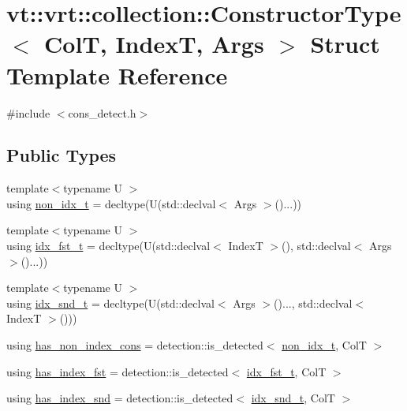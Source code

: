 \hypertarget{structvt_1_1vrt_1_1collection_1_1_constructor_type}{}\section{vt\+:\+:vrt\+:\+:collection\+:\+:Constructor\+Type$<$ ColT, IndexT, Args $>$ Struct Template Reference}
\label{structvt_1_1vrt_1_1collection_1_1_constructor_type}


{\ttfamily \#include $<$cons\+\_\+detect.\+h$>$}

\subsection*{Public Types}
\begin{DoxyCompactItemize}
\item 
{\footnotesize template$<$typename U $>$ }\\using \hyperlink{structvt_1_1vrt_1_1collection_1_1_constructor_type_a25485f9d6d78bd2e7d43f41562411d6a}{non\+\_\+idx\+\_\+t} = decltype(U(std\+::declval$<$ Args $>$()...))
\item 
{\footnotesize template$<$typename U $>$ }\\using \hyperlink{structvt_1_1vrt_1_1collection_1_1_constructor_type_a1c790c5cce774596e5027eb02fe2e1ca}{idx\+\_\+fst\+\_\+t} = decltype(U(std\+::declval$<$ IndexT $>$(), std\+::declval$<$ Args $>$()...))
\item 
{\footnotesize template$<$typename U $>$ }\\using \hyperlink{structvt_1_1vrt_1_1collection_1_1_constructor_type_a816208396419304c8a615ce54fbee9c8}{idx\+\_\+snd\+\_\+t} = decltype(U(std\+::declval$<$ Args $>$()..., std\+::declval$<$ IndexT $>$()))
\item 
using \hyperlink{structvt_1_1vrt_1_1collection_1_1_constructor_type_a576b7cfd2b91a486b3dbc53be1feb3b7}{has\+\_\+non\+\_\+index\+\_\+cons} = detection\+::is\+\_\+detected$<$ \hyperlink{structvt_1_1vrt_1_1collection_1_1_constructor_type_a25485f9d6d78bd2e7d43f41562411d6a}{non\+\_\+idx\+\_\+t}, ColT $>$
\item 
using \hyperlink{structvt_1_1vrt_1_1collection_1_1_constructor_type_a5a20a957219744988e26784279ad5783}{has\+\_\+index\+\_\+fst} = detection\+::is\+\_\+detected$<$ \hyperlink{structvt_1_1vrt_1_1collection_1_1_constructor_type_a1c790c5cce774596e5027eb02fe2e1ca}{idx\+\_\+fst\+\_\+t}, ColT $>$
\item 
using \hyperlink{structvt_1_1vrt_1_1collection_1_1_constructor_type_ad6f5e03341b8601a02ccf294e39aafd3}{has\+\_\+index\+\_\+snd} = detection\+::is\+\_\+detected$<$ \hyperlink{structvt_1_1vrt_1_1collection_1_1_constructor_type_a816208396419304c8a615ce54fbee9c8}{idx\+\_\+snd\+\_\+t}, ColT $>$
\end{DoxyCompactItemize}
